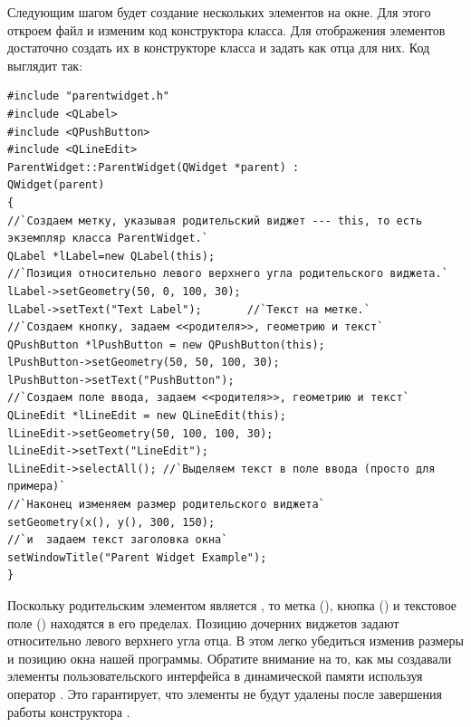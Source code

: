 Следующим шагом будет создание нескольких элементов на окне. Для этого откроем файл  и изменим
код конструктора класса. Для отображения элементов достаточно создать их в конструкторе класса и задать
 как отца для них. Код  выглядит так:
\begin{lstlisting}
#include "parentwidget.h"
#include <QLabel>
#include <QPushButton>
#include <QLineEdit>
ParentWidget::ParentWidget(QWidget *parent) :
QWidget(parent)
{
//`Создаем метку, указывая родительский виджет --- this, то есть экземпляр класса ParentWidget.`
QLabel *lLabel=new QLabel(this);
//`Позиция относительно левого верхнего угла родительского виджета.`
lLabel->setGeometry(50, 0, 100, 30);
lLabel->setText("Text Label");       //`Текст на метке.`
//`Создаем кнопку, задаем <<родителя>>, геометрию и текст`
QPushButton *lPushButton = new QPushButton(this);
lPushButton->setGeometry(50, 50, 100, 30);
lPushButton->setText("PushButton");
//`Создаем поле ввода, задаем <<родителя>>, геометрию и текст`
QLineEdit *lLineEdit = new QLineEdit(this);
lLineEdit->setGeometry(50, 100, 100, 30);
lLineEdit->setText("LineEdit");
lLineEdit->selectAll(); //`Выделяем текст в поле ввода (просто для примера)`
//`Наконец изменяем размер родительского виджета`
setGeometry(x(), y(), 300, 150);
//`и  задаем текст заголовка окна`
setWindowTitle("Parent Widget Example");
}
\end{lstlisting}

Поскольку родительским элементом является , то метка (), 
кнопка () и текстовое
поле () находятся в его пределах. Позицию дочерних виджетов 
задают относительно левого верхнего угла отца. В
этом легко убедиться изменив размеры и позицию окна нашей программы. Обратите внимание 
на то, как мы создавали элементы
пользовательского интерфейса в динамической памяти используя оператор . Это гарантирует, что элементы не
будут удалены после завершения работы конструктора .

